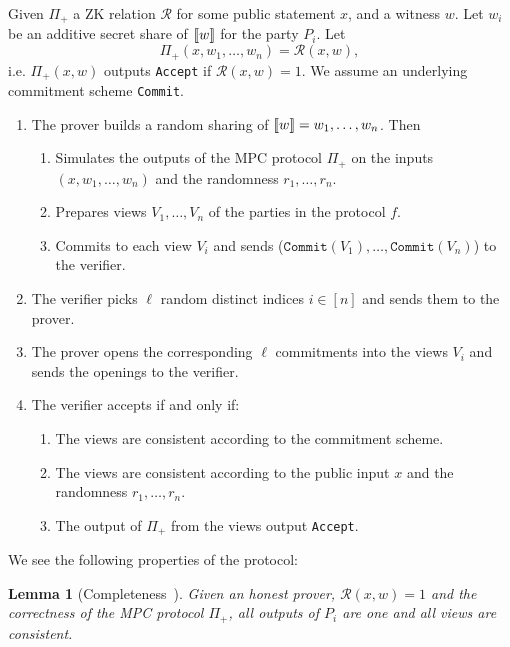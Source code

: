 \documentclass[11pt]{report}
\theoremstyle{definition}
\theoremstyle{plain}
\newtheorem{lemma}{Lemma}[section]
\begin{document}
\begin{protocol}\label{def:mpcinth_basic}
  Given $\Pi_+$ a ZK relation $\mathcal{R}$ for some public statement $x$, and a witness $w$. Let $w_i$ be an additive secret share of $\llbracket w \rrbracket$ for the party $P_i$. Let \[ \Pi_+(x, w_1, \dots, w_n) = \mathcal{R}(x, w), \] i.e. $\Pi_+(x,w)$ outputs \texttt{Accept} if $\mathcal{R}(x,w) = 1$. We assume an underlying commitment scheme \texttt{Commit}.

  \begin{enumerate}[parsep=2pt, itemsep=0pt]
    \item The prover builds a random sharing of $\llbracket w \rrbracket = w_1, \dots, w_n$. Then
          \begin{enumerate}[nolistsep]
            \item Simulates the outputs of the MPC protocol $\Pi_+$ on the inputs $(x, w_1, \dots, w_n)$ and the randomness $r_1, \dots, r_n$.
            \item Prepares views $V_1, \dots, V_n$ of the parties in the protocol $f$.
            \item Commits to each view $V_i$ and sends ($\texttt{Commit}(V_1), \dots, \texttt{Commit}(V_n)$) to the verifier.
          \end{enumerate}
    \item The verifier picks $\ell$ random distinct indices $i \in [n]$ and sends them to the prover.
    \item The prover opens the corresponding $\ell$ commitments into the views $V_i$ and sends the openings to the verifier.
    \item The verifier accepts if and only if:
          \begin{enumerate}[nolistsep]
            \item\label{prop:mpcinth_commit} The views are consistent according to the commitment scheme.
            \item\label{prop:mpcinth_consistent} The views are consistent according to the public input $x$ and the randomness $r_1, \dots, r_n$.
            \item\label{prop:mpcinth_knowledge} The output of $\Pi_+$ from the views output \texttt{Accept}.
          \end{enumerate}
  \end{enumerate}
\end{protocol}

\noindent We see the following properties of the protocol:

\begin{lemma}[Completeness~\cite{ishai2007zero}]\label{def:mpcinth_completeness}
  Given an honest prover, $\mathcal{R}(x,w) = 1$ and the correctness of the MPC protocol $\Pi_+$, all outputs of $P_i$ are one and all views are consistent.
\end{lemma}
\end{document}

